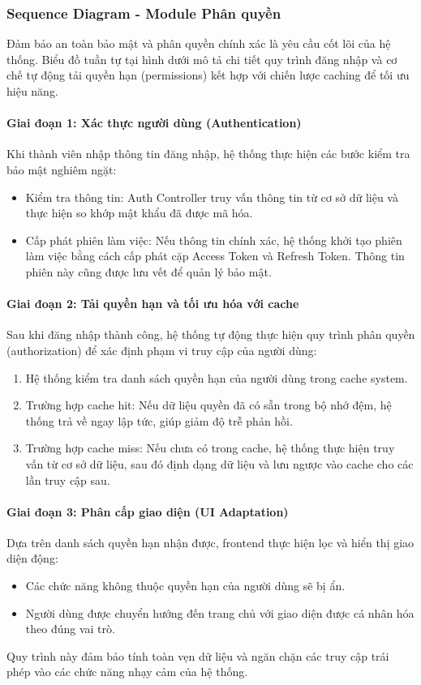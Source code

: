 \subsubsection{Sequence Diagram - Module Phân quyền}
Đảm bảo an toàn bảo mật và phân quyền chính xác là yêu cầu cốt lõi của hệ thống. Biểu đồ tuần tự tại hình dưới mô tả chi tiết quy trình đăng nhập và cơ chế tự động tải quyền hạn (permissions) kết hợp với chiến lược caching để tối ưu hiệu năng.

\paragraph{Giai đoạn 1: Xác thực người dùng (Authentication)}
Khi thành viên nhập thông tin đăng nhập, hệ thống thực hiện các bước kiểm tra bảo mật nghiêm ngặt:
\begin{itemize}
	\item Kiểm tra thông tin: Auth Controller truy vấn thông tin từ cơ sở dữ liệu và thực hiện so khớp mật khẩu đã được mã hóa.
	\item Cấp phát phiên làm việc: Nếu thông tin chính xác, hệ thống khởi tạo phiên làm việc bằng cách cấp phát cặp Access Token và Refresh Token. Thông tin phiên này cũng được lưu vết để quản lý bảo mật.
\end{itemize}

\paragraph{Giai đoạn 2: Tải quyền hạn và tối ưu hóa với cache}
Sau khi đăng nhập thành công, hệ thống tự động thực hiện quy trình phân quyền (authorization) để xác định phạm vi truy cập của người dùng:
\begin{enumerate}
	\item Hệ thống kiểm tra danh sách quyền hạn của người dùng trong cache system.
	\item Trường hợp cache hit: Nếu dữ liệu quyền đã có sẵn trong bộ nhớ đệm, hệ thống trả về ngay lập tức, giúp giảm độ trễ phản hồi.
	\item Trường hợp cache miss: Nếu chưa có trong cache, hệ thống thực hiện truy vấn từ cơ sở dữ liệu, sau đó định dạng dữ liệu và lưu ngược vào cache cho các lần truy cập sau.
\end{enumerate}

\paragraph{Giai đoạn 3: Phân cấp giao diện (UI Adaptation)}
Dựa trên danh sách quyền hạn nhận được, frontend thực hiện lọc và hiển thị giao diện động:
\begin{itemize}
	\item Các chức năng không thuộc quyền hạn của người dùng sẽ bị ẩn.
	\item Người dùng được chuyển hướng đến trang chủ với giao diện được cá nhân hóa theo đúng vai trò.
\end{itemize}
Quy trình này đảm bảo tính toàn vẹn dữ liệu và ngăn chặn các truy cập trái phép vào các chức năng nhạy cảm của hệ thống.

